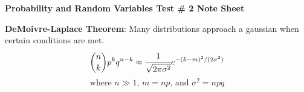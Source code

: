 \documentclass{article}
\newcommand{\sect}[1]{\noindent\textbf{#1}}
\begin{document}
	
	\begin{center}\begin{normalsize}\textbf{Probability and Random Variables Test \# 2 Note Sheet}\end{normalsize}\end{center}
	\begin{small}
	\begin{multicols*}{2}
		\setlength\abovedisplayskip{2pt}
		\setlength\belowdisplayskip{2pt}
		\setlength\abovedisplayshortskip{2pt}
		\setlength\belowdisplayshortskip{2pt}
		
%			
	
	\sect{DeMoivre-Laplace Theorem}: Many distributions approach a gaussian when certain conditions are met.
	\[{n \choose k} p^k q^{n-k} \approx \cfrac{1}{\sqrt{2\pi\sigma^2}} e^{-(k-m)^2/(2\sigma^2)}\]
	\[\text{where }n \gg 1\text{, }m = np\text{, and } \sigma^2 = npq \]
	

\end{multicols*}
\end{small}
\end{document}
